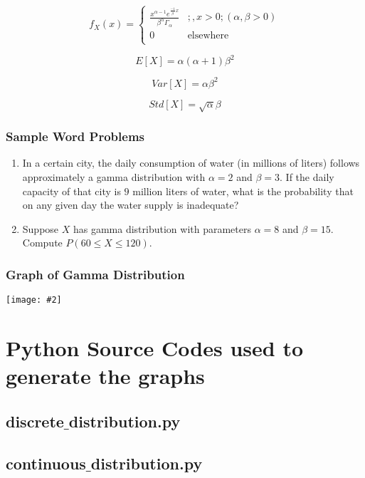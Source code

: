 \documentclass[a4paper]{article}
\newcommand*{\newincludegraphics}[2][]{
    \begin{center}
        \begin{adjustbox}{max size={\textwidth}{\textheight}}
            \texttt{[image: \#2]}
        \end{adjustbox}
    \end{center}
}
\begin{document}
    \begin{equation}
        \label{eq:gamma_pdf}
        f_X(x) = \left\{
        \begin{array}{ll}
            {\frac{x^{\alpha - 1} e^{\frac{-1}{\beta}x}}{\beta^\alpha\Gamma_\alpha}} & ;, x > 0; (\alpha, \beta > 0) \\
            0 & \mbox{elsewhere} \\
        \end{array}
    \right.
    \end{equation}

    \begin{equation}
        \label{eq:gamma_mean}
        E[X] = \alpha (\alpha + 1) \beta^2
    \end{equation}

    \begin{equation}
        \label{eq:gamma_variance}
        Var[X] = \alpha \beta^2
    \end{equation}

    \begin{equation}
        \label{eq:gamma_std}
        Std[X] = \sqrt{\alpha} \beta
    \end{equation}

    \subsubsection*{Sample Word Problems}
    \begin{enumerate}
        \item In a certain city, the daily consumption of water (in millions of liters) follows approximately a gamma distribution with $\alpha = 2$ and $\beta = 3$. If the daily capacity of that city is $9$ million liters of water, what is the probability that on any given day the water supply is inadequate?
        \item Suppose $X$ has gamma distribution with parameters $\alpha = 8$ and $\beta = 15$. Compute $P(60 \le X \le 120)$.
    \end{enumerate}

    \subsubsection*{Graph of Gamma Distribution}
    \newincludegraphics[]{(C)-Gamma_distribution_visualization.png}


    \section{Python Source Codes used to generate the graphs}

    \subsection*{discrete$\_$distribution.py}
    

    \subsection*{continuous$\_$distribution.py}
    
\end{document}
